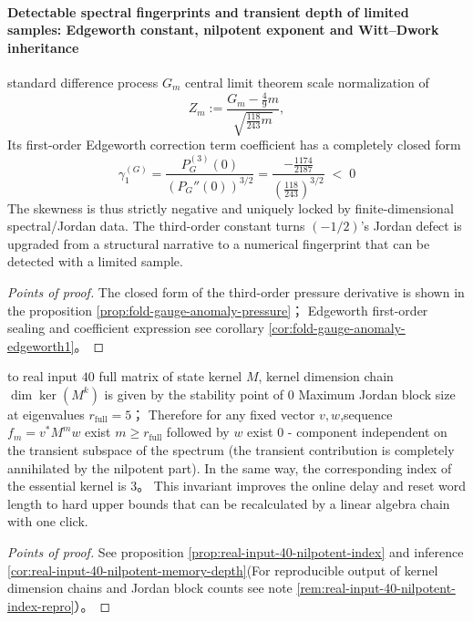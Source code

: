 \paragraph{Detectable spectral fingerprints and transient depth of limited samples: Edgeworth constant, nilpotent exponent and Witt--Dwork inheritance}

\begin{conclusion}\label{con:xi-gauge-anomaly-third-order-spectral-fingerprint}
standard difference process \(G_m\) central limit theorem scale normalization of
\[
Z_m:=\frac{G_m-\frac49 m}{\sqrt{\frac{118}{243}m}},
\]
Its first-order Edgeworth correction term coefficient has a completely closed form
\[
\boxed{\;
\gamma_1^{(G)}
=\frac{P_G^{(3)}(0)}{(P_G''(0))^{3/2}}
=\frac{-\frac{1174}{2187}}{\left(\frac{118}{243}\right)^{3/2}}\;<\;0\;}
\]
The skewness is thus strictly negative and uniquely locked by finite-dimensional spectral/Jordan data.
The third-order constant turns \((-1/2)\)'s Jordan defect is upgraded from a structural narrative to a numerical fingerprint that can be detected with a limited sample.
\end{conclusion}
\begin{proof}[Points of proof]
The closed form of the third-order pressure derivative is shown in the proposition \ref{prop:fold-gauge-anomaly-pressure}；
Edgeworth first-order sealing and coefficient expression see corollary \ref{cor:fold-gauge-anomaly-edgeworth1}。
\end{proof}

\begin{conclusion}\label{con:xi-nilpotent-index-transient-memory-depth}
to real input \(40\) full matrix of state kernel \(M\), kernel dimension chain \(\dim\ker(M^k)\) is given by the stability point of \(0\) Maximum Jordan block size at eigenvalues \(r_{\mathrm{full}}=5\)；
Therefore for any fixed vector \(v,w\),sequence \(f_m=v^\ast M^m w\) exist \(m\ge r_{\mathrm{full}}\) followed by \(w\) exist \(0\) - component independent on the transient subspace of the spectrum (the transient contribution is completely annihilated by the nilpotent part).
In the same way, the corresponding index of the essential kernel is \(3\)。
This invariant improves the online delay and reset word length to hard upper bounds that can be recalculated by a linear algebra chain with one click.
\end{conclusion}
\begin{proof}[Points of proof]
See proposition \ref{prop:real-input-40-nilpotent-index} and inference \ref{cor:real-input-40-nilpotent-memory-depth}(For reproducible output of kernel dimension chains and Jordan block counts see note \ref{rem:real-input-40-nilpotent-index-repro}）。
\end{proof}

